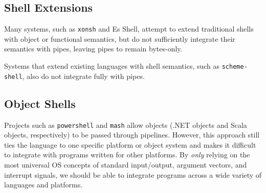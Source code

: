 \ifsigpro{ \documentclass[english,PRO]{ipsj} }
\begin{document}
\subsection{Shell Extensions} \noindent
Many systems, such as \verb/xonsh/\cite{xonsh} and Es Shell\cite{haahr}, attempt to extend traditional shells with object or functional semantics, but do not sufficiently integrate their semantics with pipes, leaving pipes to remain bytes-only.

Systems that extend existing languages with shell semantics, such as \verb/scheme-shell/, also do not integrate fully with pipes.



\subsection{Object Shells}\noindent
Projects such as \verb/powershell/\cite{powershell} and \verb/mash/\cite{mash} allow objects (.NET objects and Scala objects, respectively) to be passed through pipelines. However, this approach still ties the language to one specific platform or object system and makes it difficult to integrate with programs written for other platforms. By \emph{only} relying on the most universal OS concepts of standard input/output, argument vectors, and interrupt signals, we should be able to integrate programs across a wide variety of languages and platforms.

\end{document}
